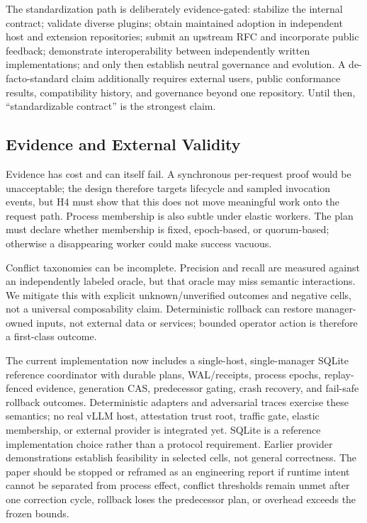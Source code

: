 \documentclass[letterpaper,twocolumn,10pt]{article}
\begin{document}
The standardization path is deliberately evidence-gated: stabilize the
internal contract; validate diverse plugins; obtain maintained adoption in
independent host and extension repositories; submit an upstream RFC and incorporate public
feedback; demonstrate interoperability between independently written
implementations; and only then establish neutral governance and evolution.
A de-facto-standard claim additionally requires external users, public
conformance results, compatibility history, and governance beyond one
repository.  Until then, ``standardizable contract'' is the strongest claim.

\subsection{Evidence and External Validity}
Evidence has cost and can itself fail.  A synchronous per-request proof would
be unacceptable; the design therefore targets lifecycle and sampled invocation
events, but H4 must show that this does not move meaningful work onto the
request path.  Process membership is also subtle under elastic workers.  The
plan must declare whether membership is fixed, epoch-based, or quorum-based;
otherwise a disappearing worker could make success vacuous.

Conflict taxonomies can be incomplete.  Precision and recall are measured
against an independently labeled oracle, but that oracle may miss semantic
interactions.  We mitigate this with explicit unknown/unverified outcomes and
negative cells, not a universal composability claim.  Deterministic rollback
can restore manager-owned inputs, not external data or services; bounded
operator action is therefore a first-class outcome.

The current implementation now includes a single-host, single-manager SQLite
reference coordinator with durable plans, WAL/receipts, process epochs,
replay-fenced evidence, generation CAS, predecessor gating, crash recovery,
and fail-safe rollback outcomes.  Deterministic adapters and adversarial traces
exercise these semantics; no real vLLM host, attestation trust root, traffic
gate, elastic membership, or external provider is integrated yet.  SQLite is a
reference implementation choice rather than a protocol requirement.  Earlier
provider demonstrations establish feasibility in selected cells, not general
correctness.  The paper should be stopped or reframed as an engineering report
if runtime intent cannot be separated from process effect, conflict thresholds
remain unmet after one correction cycle, rollback loses the predecessor plan,
or overhead exceeds the frozen bounds.
\end{document}
